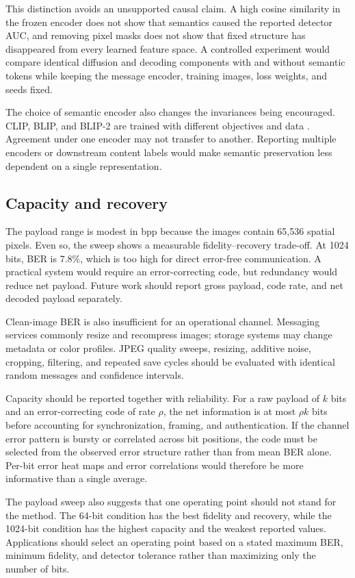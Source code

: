 \documentclass[pdflatex,sn-mathphys-num]{sn-jnl}
\begin{document}
This distinction avoids an unsupported causal claim. A high cosine similarity in the frozen encoder does not show that semantics caused the reported detector AUC, and removing pixel masks does not show that fixed structure has disappeared from every learned feature space. A controlled experiment would compare identical diffusion and decoding components with and without semantic tokens while keeping the message encoder, training images, loss weights, and seeds fixed.

The choice of semantic encoder also changes the invariances being encouraged. CLIP, BLIP, and BLIP-2 are trained with different objectives and data \cite{radford2021learning,li2022blip,li2023blip2}. Agreement under one encoder may not transfer to another. Reporting multiple encoders or downstream content labels would make semantic preservation less dependent on a single representation.

\subsection{Capacity and recovery}

The payload range is modest in bpp because the images contain 65,536 spatial pixels. Even so, the sweep shows a measurable fidelity--recovery trade-off. At 1024 bits, BER is 7.8\%, which is too high for direct error-free communication. A practical system would require an error-correcting code, but redundancy would reduce net payload. Future work should report gross payload, code rate, and net decoded payload separately.

Clean-image BER is also insufficient for an operational channel. Messaging services commonly resize and recompress images; storage systems may change metadata or color profiles. JPEG quality sweeps, resizing, additive noise, cropping, filtering, and repeated save cycles should be evaluated with identical random messages and confidence intervals.

Capacity should be reported together with reliability. For a raw payload of $k$ bits and an error-correcting code of rate $\rho$, the net information is at most $\rho k$ bits before accounting for synchronization, framing, and authentication. If the channel error pattern is bursty or correlated across bit positions, the code must be selected from the observed error structure rather than from mean BER alone. Per-bit error heat maps and error correlations would therefore be more informative than a single average.

The payload sweep also suggests that one operating point should not stand for the method. The 64-bit condition has the best fidelity and recovery, while the 1024-bit condition has the highest capacity and the weakest reported values. Applications should select an operating point based on a stated maximum BER, minimum fidelity, and detector tolerance rather than maximizing only the number of bits.
\end{document}
